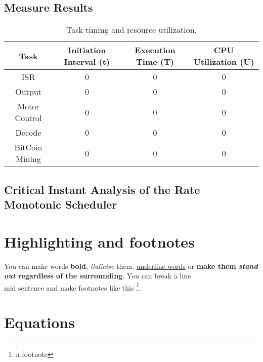 \documentclass{article}
\begin{document}
\subsection{Measure Results}
\begin{table}[ht]
\centering                      %
\begin{tabular}{c c c c}        %
Task & Initiation Interval (t) & Execution Time (T) & CPU Utilization (U) \\ [0.5ex]   %
\hline                          %
ISR & 0 & 0 & 0 \\           %
Output & 0 & 0 & 0 \\                         
Motor Control & 0 & 0  & 0 \\
Decode & 0 & 0 & 0 \\
BitCoin Mining & 0 & 0 & 0 \\ [1ex]     %
\end{tabular}
\caption{Task timing and resource utilization.} 
\label{table:nonlin}            %
\end{table}


\subsection{Critical Instant Analysis of the Rate Monotonic Scheduler}









\section{Highlighting and footnotes}
You can make words \textbf{bold}, \textit{italicise} them, \underline{underline words} or \textbf{make them \emph{stand out} regardless of the surrounding}. You can break a line\\ mid sentence and make footnotes like this \footnote{a footnote}.

\section{Equations}

\end{document}
